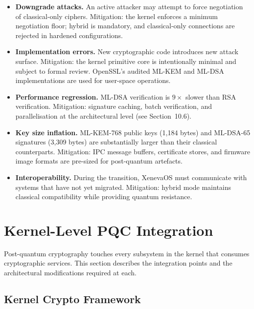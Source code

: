 \documentclass[11pt, a4paper]{article}
\begin{document}
\begin{itemize}
    \item \textbf{Downgrade attacks.} An active attacker may attempt to force negotiation of classical-only ciphers. Mitigation: the kernel enforces a minimum negotiation floor; hybrid is mandatory, and classical-only connections are rejected in hardened configurations.
    \item \textbf{Implementation errors.} New cryptographic code introduces new attack surface. Mitigation: the kernel primitive core is intentionally minimal and subject to formal review. OpenSSL's audited ML-KEM and ML-DSA implementations are used for user-space operations.
    \item \textbf{Performance regression.} ML-DSA verification is $9\times$ slower than RSA verification. Mitigation: signature caching, batch verification, and parallelisation at the architectural level (see Section~10.6).
    \item \textbf{Key size inflation.} ML-KEM-768 public keys (1,184 bytes) and ML-DSA-65 signatures (3,309 bytes) are substantially larger than their classical counterparts. Mitigation: IPC message buffers, certificate stores, and firmware image formats are pre-sized for post-quantum artefacts.
    \item \textbf{Interoperability.} During the transition, XenevaOS must communicate with systems that have not yet migrated. Mitigation: hybrid mode maintains classical compatibility while providing quantum resistance.
\end{itemize}



\section{Kernel-Level PQC Integration}\label{sec:kernel-integration}

Post-quantum cryptography touches every subsystem in the kernel that consumes cryptographic services. This section describes the integration points and the architectural modifications required at each.

\subsection{Kernel Crypto Framework}\label{sec:kcf}
\end{document}
